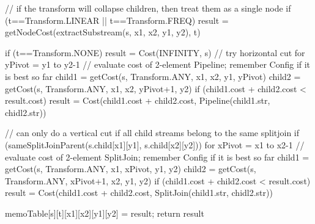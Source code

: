 // if the transform will collapse children, then treat them as a single node
if (t==Transform.LINEAR || t==Transform.FREQ)
  result = getNodeCost(extractSubstream(s, x1, x2, y1, y2), t)

if (t==Transform.NONE)
  result = Cost(INFINITY, s)
  // try horizontal cut
  for yPivot = y1 to y2-1
    // evaluate cost of 2-element Pipeline; remember Config if it is best so far
    child1 = getCost(s, Transform.ANY, x1, x2, y1, yPivot)
    child2 = getCost(s, Transform.ANY, x1, x2, yPivot+1, y2)
    if (child1.cost + child2.cost < result.cost)
      result = Cost(child1.cost + child2.cost, Pipeline(child1.str, chidl2.str))

  // can only do a vertical cut if all child streams belong to the same splitjoin
  if (sameSplitJoinParent(s.child[x1][y1], s.child[x2][y2]))
    for xPivot = x1 to x2-1
      // evaluate cost of 2-element SplitJoin; remember Config if it is best so far
      child1 = getCost(s, Transform.ANY, x1, xPivot, y1, y2)
      child2 = getCost(s, Transform.ANY, xPivot+1, x2, y1, y2)
      if (child1.cost + child2.cost < result.cost)
        result = Cost(child1.cost + child2.cost, SplitJoin(child1.str, chidl2.str))

memoTable[s][t][x1][x2][y1][y2] = result;
return result
